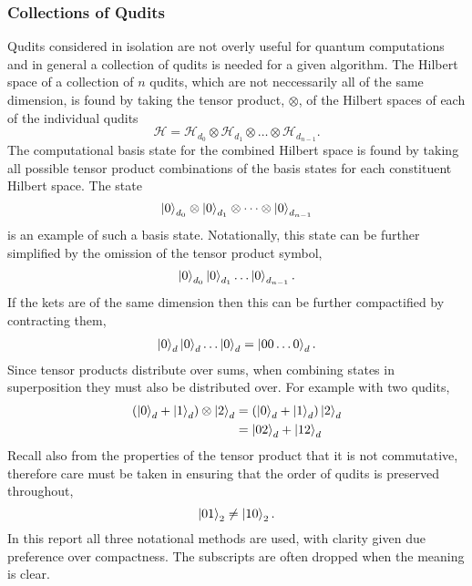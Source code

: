 \subsubsection{Collections of Qudits}
\label{subsubsection:collections_qbits}
Qudits considered in isolation are not overly useful for quantum computations and in general a collection of qudits is needed for a given algorithm.
The Hilbert space of a collection of $n$ qudits, which are not neccessarily all of the same dimension, is found by taking the tensor product, $\otimes$, of the Hilbert spaces of each of the individual qudits
\begin{equation}
    \mathcal{H} = \mathcal{H}_{d_0} \otimes \mathcal{H}_{d_1} \otimes \dots \otimes \mathcal{H}_{d_{n-1}}.
\end{equation}
The computational basis state for the combined Hilbert space is found by taking all possible tensor product combinations of the basis states for each constituent Hilbert space.
The state 
\begin{equation}
    \ket{0}_{d_0}\otimes\ket{0}_{d_1}\otimes\dots\otimes\ket{0}_{d_{n-1}}
\end{equation}
is an example of such a basis state.
Notationally, this state can be further simplified by the omission of the tensor product symbol,
\begin{equation}
    \ket{0}_{d_0}\ket{0}_{d_1}\dots\ket{0}_{d_{n-1}}.
\end{equation}
If the kets are of the same dimension then this can be further compactified by contracting them,
\begin{align}
    \ket{0}_{d}\ket{0}_{d}\dots\ket{0}_{d} = \ket{00\dots0}_d.
\end{align}
Since tensor products distribute over sums, when combining states in superposition they must also be distributed over.
For example with two qudits,
\begin{align}
    (\ket{0}_d + \ket{1}_d)\otimes\ket{2}_d &= (\ket{0}_d + \ket{1}_d)\ket{2}_d\\
    &= \ket{02}_d + \ket{12}_d
\end{align}
Recall also from the properties of the tensor product that it is not commutative, therefore care must be taken in ensuring that the order of qudits is preserved throughout,
\begin{equation}
    \ket{01}_2 \neq \ket{10}_2.
\end{equation}
In this report all three notational methods are used, with clarity given due preference over compactness.
The subscripts are often dropped when the meaning is clear.

